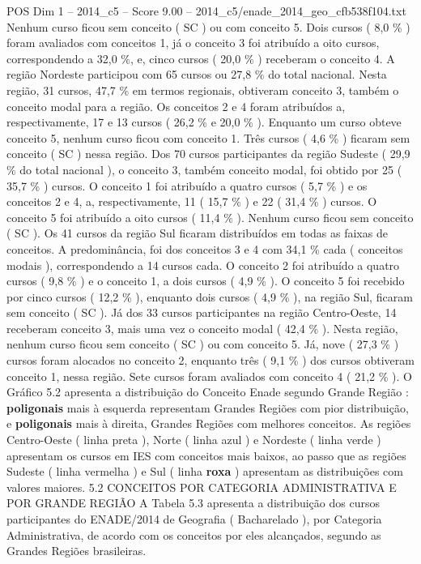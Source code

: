 \begin{textsample}{POS Dim 1 – 2014\_c5 – Score 9.00 – 2014\_c5/enade\_2014\_geo\_cfb538f104.txt}
Nenhum curso ficou sem conceito ( SC ) ou com conceito 5.
Dois cursos ( 8,0 \% ) foram avaliados com conceitos 1, já o conceito 3 foi atribuído a oito cursos, correspondendo a 32,0 \%, e, cinco cursos ( 20,0 \% ) receberam o conceito 4.
A região Nordeste participou com 65 cursos ou 27,8 \% do total nacional.
Nesta região, 31 cursos, 47,7 \% em termos regionais, obtiveram conceito 3, também o conceito modal para a região.
Os conceitos 2 e 4 foram atribuídos a, respectivamente, 17 e 13 cursos ( 26,2 \% e 20,0 \% ).
Enquanto um curso obteve conceito 5, nenhum curso ficou com conceito 1.
Três cursos ( 4,6 \% ) ficaram sem conceito ( SC ) nessa região.
Dos 70 cursos participantes da região Sudeste ( 29,9 \% do total nacional ), o conceito 3, também conceito modal, foi obtido por 25 ( 35,7 \% ) cursos.
O conceito 1 foi atribuído a quatro cursos ( 5,7 \% ) e os conceitos 2 e 4, a, respectivamente, 11 ( 15,7 \% ) e 22 ( 31,4 \% ) cursos.
O conceito 5 foi atribuído a oito cursos ( 11,4 \% ).
Nenhum curso ficou sem conceito ( SC ).
Os 41 cursos da região Sul ficaram distribuídos em todas as faixas de conceitos.
A predominância, foi dos conceitos 3 e 4 com 34,1 \% cada ( conceitos modais ), correspondendo a 14 cursos cada.
O conceito 2 foi atribuído a quatro cursos ( 9,8 \% ) e o conceito 1, a dois cursos ( 4,9 \% ).
O conceito 5 foi recebido por cinco cursos ( 12,2 \% ), enquanto dois cursos ( 4,9 \% ), na região Sul, ficaram sem conceito ( SC ).
Já dos 33 cursos participantes na região Centro-Oeste, 14 receberam conceito 3, mais uma vez o conceito modal ( 42,4 \% ).
Nesta região, nenhum curso ficou sem conceito ( SC ) ou com conceito 5.
Já, nove ( 27,3 \% ) cursos foram alocados no conceito 2, enquanto três ( 9,1 \% ) dos cursos obtiveram conceito 1, nessa região.
Sete cursos foram avaliados com conceito 4 ( 21,2 \% ).
O Gráfico 5.2 apresenta a distribuição do Conceito Enade segundo Grande Região : \textbf{poligonais} mais à esquerda representam Grandes Regiões com pior distribuição, e \textbf{poligonais} mais à direita, Grandes Regiões com melhores conceitos.
As regiões Centro-Oeste ( linha preta ), Norte ( linha azul ) e Nordeste ( linha verde ) apresentam os cursos em IES com conceitos mais baixos, ao passo que as regiões Sudeste ( linha vermelha ) e Sul ( linha \textbf{roxa} ) apresentam as distribuições com valores maiores. 5.2 CONCEITOS POR CATEGORIA ADMINISTRATIVA E POR GRANDE REGIÃO A Tabela 5.3 apresenta a distribuição dos cursos participantes do ENADE/2014 de Geografia ( Bacharelado ), por Categoria Administrativa, de acordo com os conceitos por eles alcançados, segundo as Grandes Regiões brasileiras.

\end{textsample}
